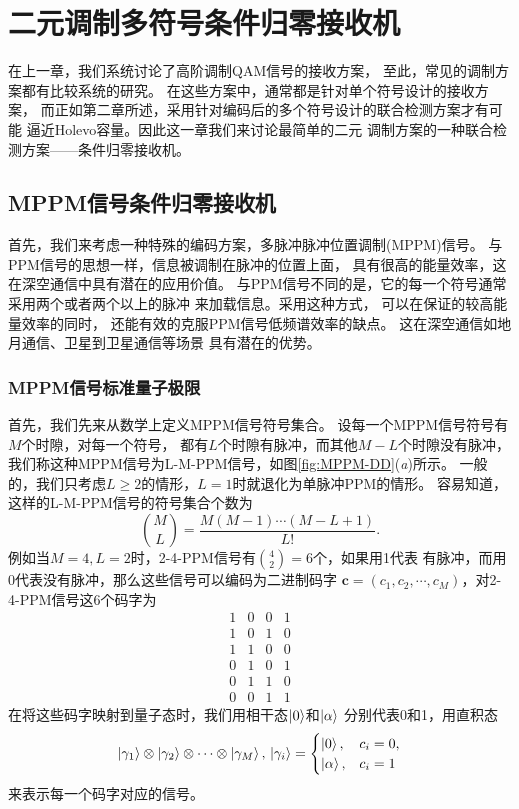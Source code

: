 \chapter{二元调制多符号条件归零接收机}
\label{chp:cpn}
在上一章，我们系统讨论了高阶调制QAM信号的接收方案，
至此，常见的调制方案都有比较系统的研究。
在这些方案中，通常都是针对单个符号设计的接收方案，
而正如第二章所述，采用针对编码后的多个符号设计的联合检测方案才有可能
逼近Holevo容量。因此这一章我们来讨论最简单的二元
调制方案的一种联合检测方案——条件归零接收机。


\section{MPPM信号条件归零接收机}
首先，我们来考虑一种特殊的编码方案，多脉冲脉冲位置调制(MPPM)信号。
与PPM信号的思想一样，信息被调制在脉冲的位置上面，
具有很高的能量效率，这在深空通信中具有潜在的应用价值\cite{hemmati2006deep}。
与PPM信号不同的是，它的每一个符号通常采用两个或者两个以上的脉冲
来加载信息。采用这种方式，
可以在保证的较高能量效率的同时，
还能有效的克服PPM信号低频谱效率的缺点\cite{sugiyama1989mppm}。
这在深空通信如地月通信、卫星到卫星通信等场景
具有潜在的优势\cite{hemmati2006deep,waseda2011numerical}。

\subsection{MPPM信号标准量子极限}
首先，我们先来从数学上定义MPPM信号符号集合。
设每一个MPPM信号符号有$M$个时隙，对每一个符号，
都有$L$个时隙有脉冲，而其他$M-L$个时隙没有脉冲，
我们称这种MPPM信号为L-M-PPM信号，如图\ref{fig:MPPM-DD}(\textit{a})所示。
一般的，我们只考虑$L \ge 2$的情形，$L=1$时就退化为单脉冲PPM的情形。
容易知道，这样的L-M-PPM信号的符号集合个数为
\begin{equation}
\binom{M}{L} = \frac{M(M-1)\cdots(M-L+1)}{L!}.
\end{equation}
例如当$M=4, L=2$时，2-4-PPM信号有$\binom{4}{2}=6$个，如果用1代表
有脉冲，而用0代表没有脉冲，那么这些信号可以编码为二进制码字
$\bm{c} = (c_1, c_2, \cdots, c_M)$，对2-4-PPM信号这6个码字为
\begin{equation}
\begin{array}{cccc}
1 & 0 & 0 & 1 \\
1 & 0 & 1 & 0 \\
1 & 1 & 0 & 0 \\
0 & 1 & 0 & 1 \\
0 & 1 & 1 & 0 \\
0 & 0 & 1 & 1   
\end{array}
\end{equation}
在将这些码字映射到量子态时，我们用相干态$\ket{0}$和$\ket{\alpha}$
分别代表0和1，用直积态
\begin{equation}
\ket{\gamma_1}\otimes\ket{\gamma_2}\otimes\cdots\otimes\ket{\gamma_M}, \\
\ket{\gamma_i} = \begin{cases}
                    \ket{0}, & c_i=0, \\
                    \ket{\alpha}, & c_i=1
                \end{cases}
\end{equation}
来表示每一个码字对应的信号。

